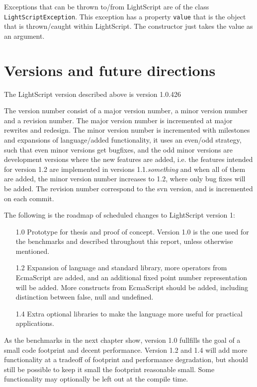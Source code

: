 \documentclass[11pt]{report}
\begin{document}
Exceptions that can be thrown to/from LightScript are of the class \verb|LightScriptException|. This exception has a property \verb|value| that is the object that is thrown/caught within LightScript. The constructor just takes the value as an argument.

\section{Versions and future directions}
The LightScript version described above is version 1.0.426

The version number consist of a major version number, a minor version number and a revision number.
The major version number is incremented at major rewrites and redesign.
The minor version number is incremented with milestones and expansions of language/added functionality, it uses an even/odd strategy, such that even minor versions get bugfixes, and the odd minor versions are development versions where the new features are added, i.e. 
the features intended for version 1.2 are implemented in versions 1.1.\emph{something} and when all of them are added, the minor version number increases to 1.2, where only bug fixes will be added.
The revision number correspond to the svn version, and is incremented on each commit.

The following is the roadmap of scheduled changes to LightScript version 1:
\begin{itemize}
\item[1.0]
Prototype for thesis and proof of concept.
Version 1.0 is the one used for the benchmarks and described throughout this report, unless otherwise mentioned. 
\item[1.2]
Expansion of language and standard library, more operators from EcmaScript are added,
and an additional fixed point number representation will be added. 
More constructs from EcmaScript should be added, including distinction between false, null and undefined.
\item[1.4]
Extra optional libraries to make the language more useful for practical applications.
\end{itemize}

As the benchmarks in the next chapter show, version 1.0 fullfills the goal of a small code footprint and decent performance.
Version 1.2 and 1.4 will add more functionality at a tradeoff of footprint and performance degradation, but should still be possible to keep it small the footprint reasonable small. Some functionality may optionally be left out at the compile time.
\end{document}

